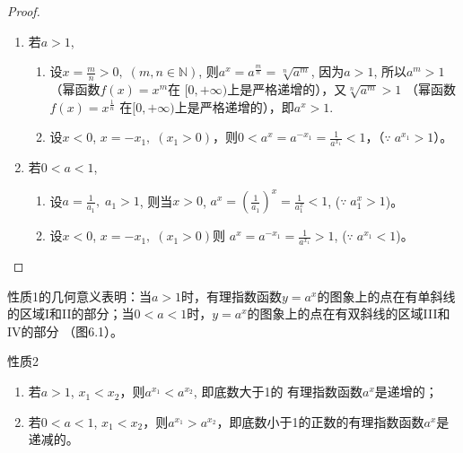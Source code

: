 \begin{proof}
\begin{enumerate}
\item 若$a>1$, 
\begin{enumerate}
  \item 设$x=\frac{m}{n}>0,\; (m,n\in\mathbb{N})$, 则$a^x=
a^{\tfrac{m}{n}}=\sqrt[n]{a^m}$, 因为$a>1$, 所以$a^m>1$ （幂函数$f(x)=x^m$在
$[0,+\infty)$上是严格递增的），又$\sqrt[n]{a^m}>1$ （幂函数$f(x)=x^{\tfrac{1}{n}}$
在$[0,+\infty)$上是严格递增的），即$a^x>1$.
\item 设$x<0$, 
$x=-x_1,\; (x_1>0)$，则$0<a^x=a^{-x_1}=\frac{1}{a^{x_1}}<1$，（$\because\; a^{x_1}>1$）。
\end{enumerate}
 
\item 若$0<a<1$, 
\begin{enumerate}
  \item 设$a=\frac{1}{a_1},\; a_1>1$, 则当$x>0$, $a^x=\left(\frac{1}{a_1}\right)^x=\frac{1}{a^x_1}<1$, ($\because\; a_1^{x}>1$)。
  \item 设$x<0$, $x=-x_1,\; (x_1>0)$则
$a^x=a^{-x_1}=\frac{1}{a^{x_1}}>1$, ($\because\; a^{x_1}<1$)。
\end{enumerate}
\end{enumerate}
\end{proof}

性质1的几何意义表明：当$a>1$时，有理指数函数$y=
a^x$的图象上的点在有单斜线的区域I和II的部分；当$0<a<
1$时，$y=a^x$的图象上的点在有双斜线的区域III和IV的部分
（图6.1）。

\begin{figure}[htp]
  \centering
{}
  \caption{}
\end{figure}

\begin{blk}{性质2}
\begin{enumerate}
  \item 若$a>1$, $x_1<x_2$，则$a^{x_1}<a^{x_2}$, 即底数大于1的
有理指数函数$a^x$是递增的；
\item 若$0<a<1$, $x_1<x_2$，则$a^{x_1}>a^{x_2}$，即底数小于1的正数的有理指数函数$a^x$是递减的。
\end{enumerate}
\end{blk}

